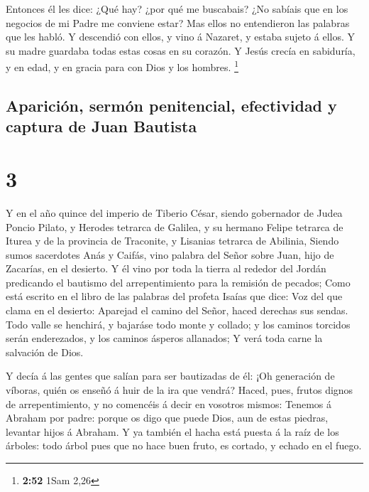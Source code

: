  Entonces él les dice: ¿Qué hay? ¿por qué me buscabais?
¿No sabíais que en los negocios de mi Padre me conviene estar?
 Mas ellos no entendieron las palabras que les habló.
 Y descendió con ellos, y vino á Nazaret, y estaba sujeto
á ellos. Y su madre guardaba todas estas cosas en su corazón.
 Y Jesús crecía en sabiduría, y en edad, y en gracia para
con Dios y los hombres. \footnote{\textbf{2:52} 1Sam 2,26}

\hypertarget{apariciuxf3n-sermuxf3n-penitencial-efectividad-y-captura-de-juan-bautista}{%
\subsection{Aparición, sermón penitencial, efectividad y captura de Juan
Bautista}\label{apariciuxf3n-sermuxf3n-penitencial-efectividad-y-captura-de-juan-bautista}}

\hypertarget{section-2}{%
\section{3}\label{section-2}}

 Y en el año quince del imperio de Tiberio César, siendo
gobernador de Judea Poncio Pilato, y Herodes tetrarca de Galilea, y su
hermano Felipe tetrarca de Iturea y de la provincia de Traconite, y
Lisanias tetrarca de Abilinia,  Siendo sumos sacerdotes
Anás y Caifás, vino palabra del Señor sobre Juan, hijo de Zacarías, en
el desierto.  Y él vino por toda la tierra al rededor del
Jordán predicando el bautismo del arrepentimiento para la remisión de
pecados;  Como está escrito en el libro de las palabras
del profeta Isaías que dice: Voz del que clama en el desierto: Aparejad
el camino del Señor, haced derechas sus sendas.  Todo
valle se henchirá, y bajaráse todo monte y collado; y los caminos
torcidos serán enderezados, y los caminos ásperos allanados;
 Y verá toda carne la salvación de Dios.

 Y decía á las gentes que salían para ser bautizadas de
él: ¡Oh generación de víboras, quién os enseñó á huir de la ira que
vendrá?  Haced, pues, frutos dignos de arrepentimiento, y
no comencéis á decir en vosotros mismos: Tenemos á Abraham por padre:
porque os digo que puede Dios, aun de estas piedras, levantar hijos á
Abraham.  Y ya también el hacha está puesta á la raíz de
los árboles: todo árbol pues que no hace buen fruto, es cortado, y
echado en el fuego.

